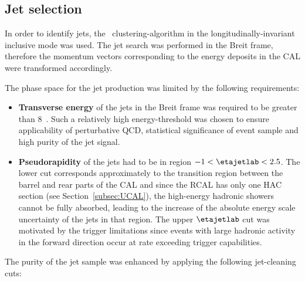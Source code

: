 \subsection{Jet selection}
\label{subsec:jetselect}
In order to identify jets, the \kt~clustering-algorithm in the longitudinally-invariant inclusive mode was used. The jet search was performed in the Breit frame, therefore the momentum vectors corresponding to the energy deposits in the CAL were transformed accordingly. 

The phase space for the jet production was limited by the following requirements:
\begin{itemize}
	\item \textbf{Transverse energy} of the jets in the Breit frame was required to be greater than 8~\GeV. Such a relatively high energy-threshold was chosen to ensure applicability of perturbative QCD, statistical significance of event sample and high purity of the jet signal.
	\item \textbf{Pseudorapidity} of the jets had to be in region $-1<\etajetlab<2.5$. The lower cut corresponds approximately to the transition region between the barrel and rear parts of the CAL and since the RCAL has only one HAC section (see Section~\ref{subsec:UCAL}), the high-energy hadronic showers cannot be fully absorbed, leading to the increase of the absolute energy scale uncertainty of the jets in that region. The upper $\etajetlab$ cut was motivated by the trigger limitations since events with large hadronic activity in the forward direction occur at  rate exceeding trigger capabilities.
	
\end{itemize}
The purity of the jet sample was enhanced by applying the following jet-cleaning cuts:

